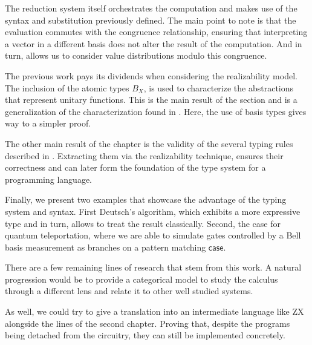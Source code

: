 \documentclass[runningheads,orivec]{llncs}
\newcommand\basis[1]{\ensuremath{B_{ #1 }}}
\begin{document}
The reduction system itself orchestrates the computation and makes use of the syntax and substitution previously defined. The main point to note is that the evaluation commutes with the congruence relationship, ensuring that interpreting a vector in a different basis does not alter the result of the computation. And in turn, allows us to consider value distributions modulo this congruence.

The previous work pays its dividends when considering the realizability model. The inclusion of the atomic types $\basis{X}$, is used to characterize the abstractions that represent unitary functions. This is the main result of the section and is a generalization of the characterization found in \cite{DiazcaroGuillermoMiquelValironLICS19}. Here, the use of basis types gives way to a simpler proof. 

The other main result of the chapter is the validity of the several typing rules described in . Extracting them via the realizability technique, ensures their correctness and can later form the foundation of the type system for a programming language.

Finally, we present two examples that showcase the advantage of the typing system and syntax. First Deutsch's algorithm, which exhibits a more expressive type and in turn, allows to treat the result classically. Second, the case for quantum teleportation, where we are able to simulate gates controlled by a Bell basis measurement as branches on a pattern matching $\mathsf{case}$. 

There are a few remaining lines of research that stem from this work. A natural progression would be to provide a categorical model to study the calculus through a different lens and relate it to other well studied systems. 

As well, we could try to give a translation into an intermediate language like ZX alongside the lines of the second chapter. Proving that, despite the programs being detached from the circuitry, they can still be  implemented concretely.

\end{document}
